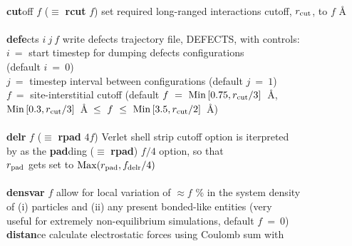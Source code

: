 \begin{tabbing}
\>                                              \> \\
\> {\bf cut}off $f$ ($\equiv$ {\bf rcut} $f$)   \> set required long-ranged interactions cutoff, $r_{\rm cut}$, to $f$ \AA~ \\
\>                                              \> \\
\> {\bf defe}cts $i~j~f$                        \> write defects trajectory file, DEFECTS, with controls: \\
\>                                              \> $i~=$ start timestep for dumping defects configurations \\
\>                                              \> \phantom{xxx} (default $i~=~0$) \\
\>                                              \> $j~=$ timestep interval between configurations (default $j~=~1$) \\
\>                                              \> $f~=$ site-interstitial cutoff (default $f~=~{\rm Min}\left[0.75,r_{\rm cut}/3\right]$~\AA, \\
\>                                              \> ${\rm Min}\left[0.3,r_{\rm cut}/3\right]$~\AA~$\le~f~\le~{\rm Min}\left[3.5,r_{\rm cut}/2\right]$~\AA) \\
\>                                              \> \\
\> {\bf delr} $f$  ($\equiv$ {\bf rpad} $4f$)   \> \C Verlet shell strip cutoff option is iterpreted \\
\>                                              \> by \D as the {\bf pad}ding ($\equiv$ {\bf rpad}) $f/4$ option, so that \\
\>                                              \> $r_{\rm pad}$ gets set to ${\rm Max}(r_{\rm pad},f_{\rm delr}/4)$ \\
\>                                              \> \\
\> {\bf densvar} $f$                            \> allow for local variation of $\approx f$ \% in the system density \\
\>                                              \> of (i) particles and (ii) any present bonded-like entities (very \\
\>                                              \> useful for extremely non-equilibrium simulations, default $f~=~0$) \\
\> {\bf distan}ce                               \> calculate electrostatic forces using Coulomb sum with \\

\end{tabbing}
